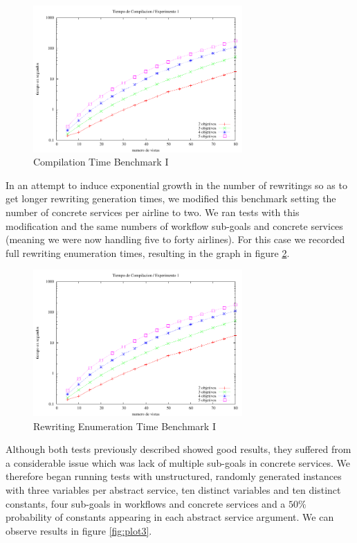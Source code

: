\documentclass{llncs}
\begin{document}
\begin{figure}
\centering
\includegraphics[width=8cm]{plot1.pdf}
\caption{Compilation Time Benchmark I}
\label{fig:plot1}
\end{figure}

In an attempt to induce exponential growth in the number of rewritings so as to
get longer rewriting generation times, we modified this benchmark setting the
number of concrete services per airline to two. We ran tests with this modification and the
same numbers of workflow sub-goals and concrete services (meaning we were now handling five to
forty airlines). For this case we recorded full rewriting enumeration times,
resulting in the graph in figure \ref{fig:plot2}.

\begin{figure}
\centering
\includegraphics[width=8cm]{plot1.pdf}
\caption{Rewriting Enumeration Time Benchmark I}
\label{fig:plot2}
\end{figure}

Although both tests previously described showed good results, they suffered from
a considerable issue which was lack of multiple sub-goals in concrete services.
We therefore began running tests with unstructured, randomly generated instances
with three variables per abstract service, ten distinct variables and ten
distinct constants, four sub-goals in workflows and concrete services and a
$50\%$ probability of constants appearing in each abstract service argument. We
can observe results in figure \ref{fig:plot3}.
\end{document}
